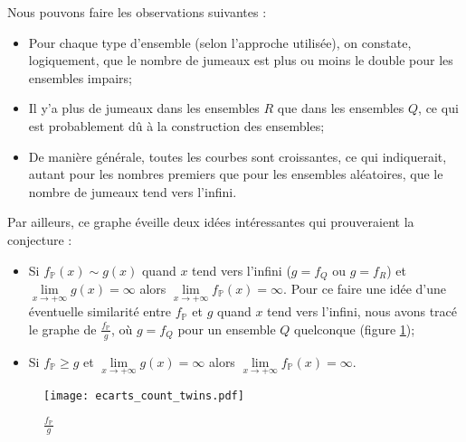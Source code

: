 \documentclass[../main.tex]{subfiles}
\begin{document}
 \newpage
 
 Nous pouvons faire les observations suivantes : 
 	\begin{itemize}
	\item Pour chaque type d'ensemble (selon l'approche utilisée), on constate, logiquement, que le nombre de jumeaux est plus ou moins le double pour les ensembles impairs;
	\item Il y'a plus de jumeaux dans les ensembles $R$ que dans les ensembles $Q$, ce qui est probablement dû à la construction des ensembles;
	\item De manière générale, toutes les courbes sont croissantes, ce qui indiquerait, autant pour les nombres premiers que pour les ensembles aléatoires, que le nombre de jumeaux tend vers l'infini. 
	\end{itemize}
	
	Par ailleurs, ce graphe éveille deux idées intéressantes qui prouveraient la conjecture :
\begin{itemize}
	\item Si $f_{\mathbb{P}}(x) \sim g(x)$ quand $x$ tend vers l'infini ($g = f_{Q}$ ou $g = f_{R}$) et $\lim\limits_{x \rightarrow +\infty} g(x) = \infty$ alors $\lim\limits_{x \rightarrow +\infty} f_{\mathbb{P}}(x) = \infty$. Pour ce faire une idée d'une éventuelle similarité entre $f_{\mathbb{P}}$ et $g$ quand $x$ tend vers l'infini, nous avons tracé le graphe de $\frac{f_{\mathbb{P}}}{g}$, où $g = f_{Q}$ pour un ensemble $Q$ quelconque (figure \ref{im:image6});
	\item Si $f_{\mathbb{P}} \geqslant g$ et $\lim\limits_{x \rightarrow +\infty} g(x) = \infty$ alors $\lim\limits_{x \rightarrow +\infty} f_{\mathbb{P}}(x) = \infty$.
\end{itemize}
\begin{figure}[H]
 \centering
 \texttt{[image: ecarts\_count\_twins.pdf]}
 \caption{$\frac{f_{\mathbb{P}}}{g}$}
 \label{im:image6}
 \end{figure}
\end{document}
